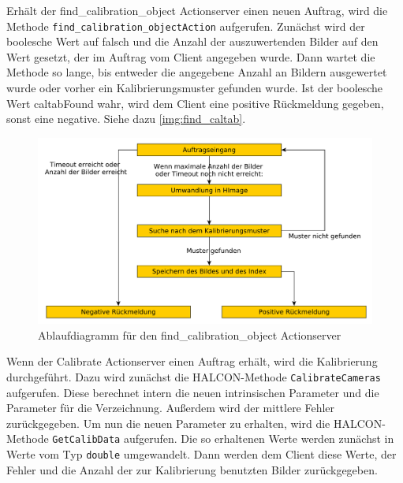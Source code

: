 Erhält der find\_calibration\_object Actionserver einen neuen Auftrag, wird die Methode \texttt{find\_calibration\_objectAction} aufgerufen. Zunächst wird der boolesche Wert auf falsch und die Anzahl der auszuwertenden Bilder auf den Wert gesetzt, der im Auftrag vom Client angegeben wurde. Dann wartet die Methode so lange, bis entweder die angegebene Anzahl an Bildern ausgewertet wurde oder vorher ein Kalibrierungsmuster gefunden wurde. Ist der boolesche Wert caltabFound wahr, wird dem Client eine positive Rückmeldung gegeben, sonst eine negative. Siehe dazu \autoref{img:find_caltab}.
\begin{figure}
\centering
\includegraphics[width=\textwidth]{images/find_caltab}
\caption{Ablaufdiagramm für den find\_calibration\_object Actionserver}\label{img:find_caltab}
\end{figure}

Wenn der Calibrate Actionserver einen Auftrag erhält, wird die Kalibrierung durchgeführt. Dazu wird zunächst die HALCON-Methode \texttt{CalibrateCameras} aufgerufen. Diese berechnet intern die neuen intrinsischen Parameter und die Parameter für die Verzeichnung. Außerdem wird der mittlere Fehler zurückgegeben. Um nun die neuen Parameter zu erhalten, wird die HALCON-Methode \texttt{GetCalibData} aufgerufen. Die so erhaltenen Werte werden zunächst in Werte vom Typ \texttt{double} umgewandelt. Dann werden dem Client diese Werte, der Fehler und die Anzahl der zur Kalibrierung benutzten Bilder zurückgegeben.

